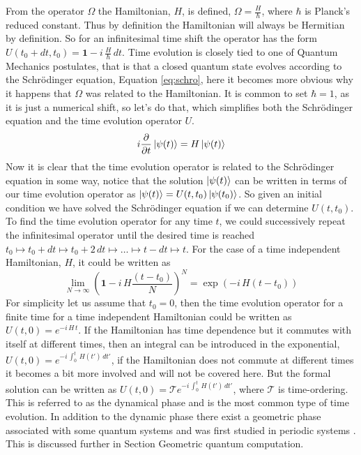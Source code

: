 From the operator $\Omega$ the Hamiltonian, $H$, is defined, $\Omega = \frac{H}{\hbar}$, where $\hbar$ is Planck's reduced constant. Thus by definition the Hamiltonian will always be Hermitian by definition. So for an infinitesimal time shift the operator has the form $U(t_0 + dt, t_0) = \mathbf{1} - i\,\frac{H}{\hbar} \,dt$.
Time evolution is closely tied to one of Quantum Mechanics postulates, that is that a closed quantum state evolves according to the Schrödinger equation, Equation \ref{eq:schro}, here it becomes more obvious why it happens that $\Omega$ was related to the Hamiltonian. It is common to set $\hbar = 1$, as it is just a numerical shift, so let's do that, which simplifies both the Schrödinger equation and the time evolution operator $U$. 
\begin{equation} 
i \pdv{}{t} \ket{\psi(t)} = H \ket{\psi(t)}
\label{eq:schro}
\end{equation} 
Now it is clear that the time evolution operator is related to the Schrödinger equation in some way, notice that the solution $\ket{\psi(t)}$ can be written in terms of our time evolution operator as
$\ket{\psi(t)} = U(t,t_0)\ket{\psi(t_0)}$. So given an initial condition we have solved the Schrödinger equation if we can determine $U(t,t_0)$.  
To find the time evolution operator for any time $t$, we could successively repeat the infinitesimal operator until the desired time is reached $t_0 \mapsto t_0 + dt \mapsto t_0 + 2\,dt \mapsto \dots \mapsto t - dt \mapsto t$. For the case of a time independent Hamiltonian, $H$, it could be written as
\begin{equation}
\lim_{N \rightarrow \infty} \left(\mathbf{1} - i\,H\frac{(t-t_0)}{N} \right)^N = \exp\left(- i\,H(t-t_0) \right)
\end{equation}
For simplicity let us assume that $t_0 = 0$, then the time evolution operator for a finite time for a time independent Hamiltonian could be written as $U(t,0) = e^{-i\,H\,t}$. If the Hamiltonian has time dependence but it commutes with itself at different times, then an integral can be introduced in the exponential, $U(t,0) = e^{-i\,\int_0^t \,H(t')\, dt'}$, if the Hamiltonian does not commute at different times it becomes a bit more involved and will not be covered here. But the formal solution can be written as $U(t,0) = \mathcal{T}e^{-i\,\int_0^t \,H(t')\, dt'}$, where $\mathcal{T}$ is time-ordering. This is referred to as the dynamical phase and is the most common type of time evolution. In addition to the dynamic phase there exist a geometric phase associated with some quantum systems and was first studied in periodic systems \cite{berry}. This is discussed further in Section Geometric quantum computation.

